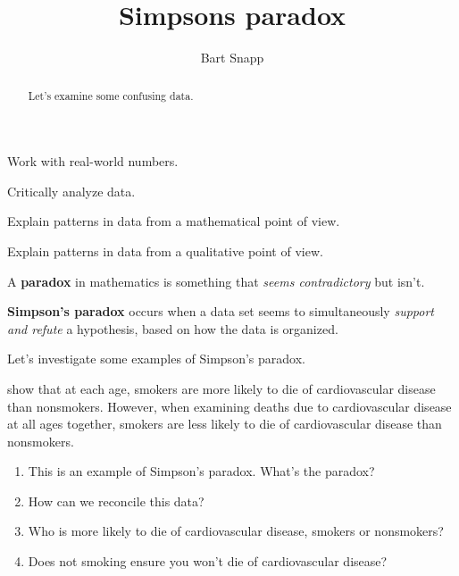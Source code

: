\documentclass[nooutcomes,noauthor,hints,handout]{ximera}
\title{Simpsons paradox}
\author{Bart Snapp}
\begin{document}
\begin{abstract}
  Let's examine some confusing data.
\end{abstract}
\maketitle

\begin{listOutcomes}
\item Work with real-world numbers.
\item Critically analyze data.
\item Explain patterns in data from a mathematical point of view.
\item Explain patterns in data from a qualitative point of view.
\end{listOutcomes}


A \textbf{paradox} in mathematics is something that \textit{seems
contradictory} but isn't.



\textbf{Simpson's paradox} occurs when a data set seems to
simultaneously \textit{support and refute} a hypothesis, based on how
the data is organized.



Let's investigate some examples of Simpson's paradox. 


\mynewpage



\begin{question}

  show that at each age, smokers are more likely to die of
  cardiovascular disease than nonsmokers.  However, when examining
  deaths due to cardiovascular disease at all ages together, smokers
  are less likely to die of cardiovascular disease than nonsmokers.

\begin{enumerate}
\item This is an example of Simpson's paradox. What's the paradox?
\item How can we reconcile this data?
\item Who is more likely to die of cardiovascular disease, smokers or
  nonsmokers?
\item Does not smoking ensure you won't die of cardiovascular disease?
\end{enumerate}
\end{question}
\mynewpage
\end{document}
